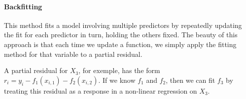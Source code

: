 \paragraph{Backfitting} This method fits a model involving multiple predictors by repeatedly updating the fit for each predictor in turn, holding the others fixed. The beauty of this approach is that each time we update a function, we simply apply the fitting method for that variable to a partial residual.

\begin{note}
    A partial residual for $X_3$, for exemple, has the form $r_i = y_i - f_1(x_{i,1}) - f_2(x_{i,2})$. If we know $f_1$ and $f_2$, then we can fit $f_3$ by treating this residual as a response in a non-linear regression on $X_3$.
\end{note}


